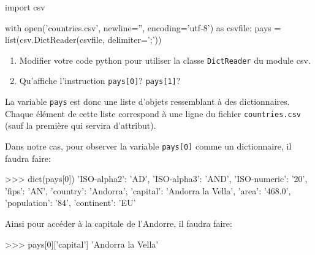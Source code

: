 			\begin{CodePythontexAlt}[TaillePolice=\normalsize, Largeur=1\linewidth,Centre,PremLigne=1, Lignes=false,]{}
import csv

with open('countries.csv', newline='', encoding='utf-8') as csvfile:
    pays = list(csv.DictReader(csvfile, delimiter=';'))
\end{CodePythontexAlt}

\begin{exercice_cours}{}
\begin{enumerate}
	\item Modifier votre code python pour utiliser la classe \verb|DictReader| du module csv.
	\item Qu'affiche l'instruction \texttt{pays[0]}? \texttt{pays[1]}?
\end{enumerate}
\end{exercice_cours}




\begin{remarque}{\quad}{}
La variable \verb+pays+ est donc une liste d'objets ressemblant à des dictionnaires. Chaque élément de cette liste correspond à une ligne du fichier \verb|countries.csv| (sauf la première qui servira d'attribut).

\end{remarque}

\medskip

Dans notre cas, pour observer la variable \verb+pays[0]+ comme un dictionnaire, il faudra faire:

			\begin{CodePythontexAlt}[TaillePolice=\normalsize, Largeur=1\linewidth,Centre,PremLigne=1, Lignes=false,]{}
>>> dict(pays[0])
{'ISO-alpha2': 'AD', 'ISO-alpha3': 'AND', 'ISO-numeric': '20', 'fips': 'AN', 
'country': 'Andorra', 'capital': 'Andorra la Vella', 'area': '468.0', 
'population': '84', 'continent': 'EU'}
\end{CodePythontexAlt}

\medskip

Ainsi pour accéder à la capitale de l'Andorre, il faudra faire:
	
			\begin{CodePythontexAlt}[TaillePolice=\normalsize, Largeur=1\linewidth,Centre,PremLigne=1, Lignes=false,]{}
>>> pays[0]['capital']
'Andorra la Vella'
\end{CodePythontexAlt}

